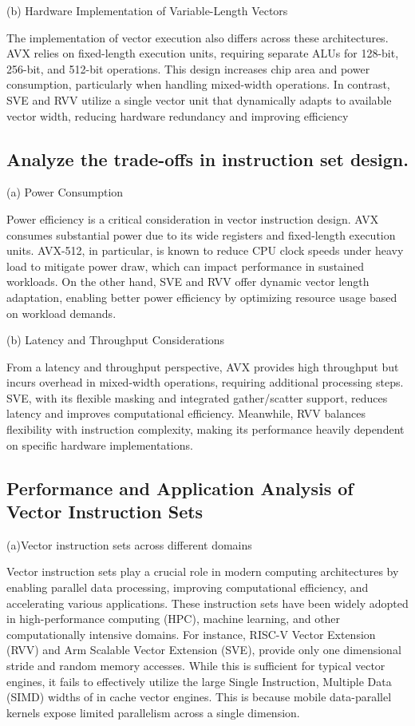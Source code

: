 \documentclass[conference]{IEEEtran}
\begin{document}
(b) Hardware Implementation of Variable-Length Vectors

The implementation of vector execution also differs across these architectures. AVX relies on fixed-length execution units, requiring separate ALUs for 128-bit, 256-bit, and 512-bit operations. This design increases chip area and power consumption, particularly when handling mixed-width operations\cite{b3}. In contrast, SVE and RVV utilize a single vector unit that dynamically adapts to available vector width, reducing hardware redundancy and improving efficiency\cite{b5}

\subsection{ Analyze the trade-offs in instruction set design.}
(a) Power Consumption

Power efficiency is a critical consideration in vector instruction design. AVX consumes substantial power due to its wide registers and fixed-length execution units. AVX-512, in particular, is known to reduce CPU clock speeds under heavy load to mitigate power draw, which can impact performance in sustained workloads\cite{b3}. On the other hand, SVE and RVV offer dynamic vector length adaptation, enabling better power efficiency by optimizing resource usage based on workload demands\cite{b4}.

(b) Latency and Throughput Considerations

From a latency and throughput perspective, AVX provides high throughput but incurs overhead in mixed-width operations, requiring additional processing steps\cite{b1}. SVE, with its flexible masking and integrated gather/scatter support, reduces latency and improves computational efficiency\cite{b5}. Meanwhile, RVV balances flexibility with instruction complexity, making its performance heavily dependent on specific hardware implementations\cite{b6}.


\subsection{Performance and Application Analysis of Vector Instruction Sets}

(a)Vector instruction sets across different domains

Vector instruction sets play a crucial role in modern computing architectures by enabling parallel data processing, improving computational efficiency, and accelerating various applications. These instruction sets have been widely adopted in high-performance computing (HPC), machine learning, and other computationally intensive domains. For instance, RISC-V Vector Extension (RVV) and Arm Scalable Vector Extension (SVE), provide only one dimensional stride and random memory accesses. While this is sufficient for typical vector engines, it fails to effectively utilize the large Single Instruction, Multiple Data (SIMD) widths of in cache vector engines. This is because mobile data-parallel kernels expose limited parallelism across a single dimension.
\end{document}
